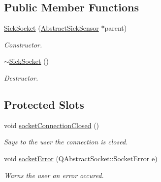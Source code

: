 \subsection*{Public Member Functions}
\begin{DoxyCompactItemize}
\item 
\hypertarget{classpacpus_1_1SickSocket_ab866c3615462372f1a1fa790a300c1d7}{\hyperlink{classpacpus_1_1SickSocket_ab866c3615462372f1a1fa790a300c1d7}{Sick\-Socket} (\hyperlink{classpacpus_1_1AbstractSickSensor}{Abstract\-Sick\-Sensor} $\ast$parent)}\label{classpacpus_1_1SickSocket_ab866c3615462372f1a1fa790a300c1d7}

\begin{DoxyCompactList}\small\item\em Constructor. \end{DoxyCompactList}\item 
\hypertarget{classpacpus_1_1SickSocket_adca7f170e3fe00352175019703afdd6c}{\hyperlink{classpacpus_1_1SickSocket_adca7f170e3fe00352175019703afdd6c}{$\sim$\-Sick\-Socket} ()}\label{classpacpus_1_1SickSocket_adca7f170e3fe00352175019703afdd6c}

\begin{DoxyCompactList}\small\item\em Destructor. \end{DoxyCompactList}\end{DoxyCompactItemize}
\subsection*{Protected Slots}
\begin{DoxyCompactItemize}
\item 
void \hyperlink{classpacpus_1_1SickSocket_acb35dc2896ba2e6f4e4bc749f04fc71a}{socket\-Connection\-Closed} ()
\begin{DoxyCompactList}\small\item\em Says to the user the connection is closed. \end{DoxyCompactList}\item 
\hypertarget{classpacpus_1_1SickSocket_aea9be9bcfc97681ed665cf4095f351cb}{void \hyperlink{classpacpus_1_1SickSocket_aea9be9bcfc97681ed665cf4095f351cb}{socket\-Error} (Q\-Abstract\-Socket\-::\-Socket\-Error e)}\label{classpacpus_1_1SickSocket_aea9be9bcfc97681ed665cf4095f351cb}

\begin{DoxyCompactList}\small\item\em Warns the user an error occured. \end{DoxyCompactList}\end{DoxyCompactItemize}


